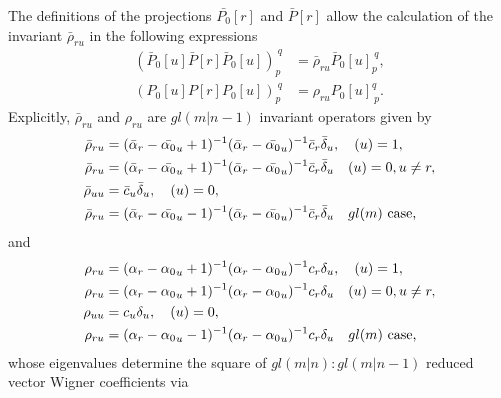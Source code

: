 \documentclass[12pt]{article}
\def\nn{\nonumber}
\begin{document}
The definitions of the projections $\bar{P_0}[r]$ and $\bar{P}[r]$ allow the calculation of the invariant $\bar{\rho}_{ru}$ in the following expressions \cite{GIW2}
\begin{align}
(\bar{P}_0[u]\bar{P}[r]\bar{P}_0[u])_p^{\ q} &= \bar{\rho}_{ru}\bar{P}_0[u]_p^{\ q},\\
({P_0}[u]{P}[r]{P_0}[u])_p^{\ q} &= {\rho}_{ru}{P_0}[u]_{\ p}^q .
\end{align}
Explicitly, $\bar{\rho}_{ru}$ and ${\rho}_{ru}$ are $gl(m|n-1)$ invariant operators given by
\begin{align}
\bar{\rho}_{ru} &= (\bar{\alpha}_r-\bar{\alpha_0}_u +
1)^{-1}(\bar{\alpha}_r-\bar{\alpha_0}_u)^{-1}\bar{c}_r\bar{\delta}_u, \ \ \ (u) = 1, \nn\\
\bar{\rho}_{ru} &= (\bar{\alpha}_r-\bar{\alpha_0}_u +
1)^{-1}(\bar{\alpha}_r-\bar{\alpha_0}_u)^{-1}\bar{c}_r\bar{\delta}_u \ \ \ (u) = 0, u \neq r,
\nn\\
\bar{\rho}_{uu} &= \bar{c}_u \bar{\delta}_u, \ \ \ (u) = 0, \nn\\
\bar{\rho}_{ru} &= (\bar{\alpha}_r-\bar{\alpha_0}_u -
1)^{-1}(\bar{\alpha}_r-\bar{\alpha_0}_u)^{-1}\bar{c}_r \bar{\delta}_u \ \ \ gl(m)
\hbox{~case,} 
\label{RhoBarExp}
\end{align}
and
\begin{align}
{\rho}_{ru} &= ({\alpha}_r-{\alpha_0}_u +
1)^{-1}({\alpha}_r-{\alpha_0}_u)^{-1}{c}_r{\delta}_u, \ \ \ (u) = 1, \nn\\
{\rho}_{ru} &= ({\alpha}_r-{\alpha_0}_u +
1)^{-1}({\alpha}_r-{\alpha_0}_u)^{-1}{c}_r{\delta}_u \ \ \ (u) = 0, u \neq r,
\nn\\
{\rho}_{uu} &= {c}_u {\delta}_u, \ \ \ (u) = 0, \nn\\
{\rho}_{ru} &= ({\alpha}_r-{\alpha_0}_u -
1)^{-1}({\alpha}_r-{\alpha_0}_u)^{-1}{c}_r {\delta}_u \ \ \ gl(m)
\hbox{~case,} 
\label{RhoExp}
\end{align}
whose eigenvalues determine the square of $gl(m|n):gl(m|n-1)$ reduced vector Wigner
coefficients via
\end{document}
